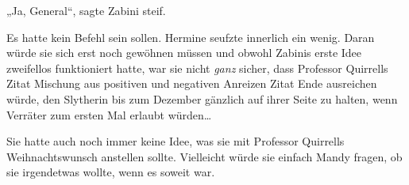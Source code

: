 „Ja, General“, sagte Zabini steif.

Es hatte kein Befehl sein sollen. Hermine seufzte innerlich ein wenig. Daran würde sie sich erst noch gewöhnen müssen und obwohl Zabinis erste Idee zweifellos funktioniert hatte, war sie nicht \emph{ganz} sicher, dass Professor Quirrells Zitat Mischung aus positiven und negativen Anreizen Zitat Ende ausreichen würde, den Slytherin bis zum Dezember gänzlich auf ihrer Seite zu halten, wenn Verräter zum ersten Mal erlaubt würden…

Sie hatte auch noch immer keine Idee, was sie mit Professor Quirrells Weihnachtswunsch anstellen sollte. Vielleicht würde sie einfach Mandy fragen, ob sie irgendetwas wollte, wenn es soweit war.

